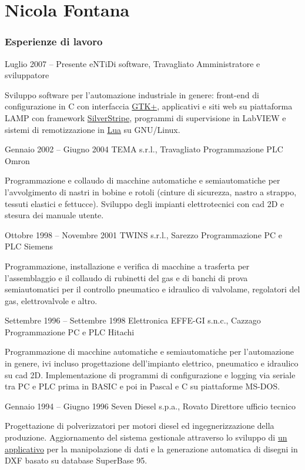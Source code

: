 \documentclass[10pt]{tccv}
\begin{document}
\part{Nicola Fontana}

\section{Esperienze di lavoro}

\begin{eventlist}

\item{Luglio 2007 -- Presente}
     {eNTiDi software, Travagliato}
     {Amministratore e sviluppatore}

Sviluppo software per l'automazione industriale in genere:
front-end di configurazione in C con interfaccia
\href{http://www.gtk.org/}{GTK+}, applicativi e siti web su piattaforma
LAMP con framework \href{http://www.silverstripe.org/}{SilverStripe},
programmi di supervisione in LabVIEW e sistemi di remotizzazione in
\href{http://www.lua.org/}{Lua} su GNU/Linux.

\item{Gennaio 2002 -- Giugno 2004}
     {TEMA s.r.l., Travagliato}
     {Programmazione PLC Omron}

Programmazione e collaudo di macchine automatiche e
semiautomatiche per l'avvolgimento di nastri in bobine e rotoli (cinture
di sicurezza, nastro a strappo, tessuti elastici e fettucce). Sviluppo
degli impianti elettrotecnici con cad 2D e stesura dei manuale
utente.

\item{Ottobre 1998 -- Novembre 2001}
     {TWINS s.r.l., Sarezzo}
     {Programmazione PC e PLC Siemens}

Programmazione, installazione e verifica di macchine a
trasferta per l'assemblaggio e il collaudo di rubinetti del gas e di
banchi di prova semiautomatici per il controllo pneumatico e idraulico
di valvolame, regolatori del gas, elettrovalvole e altro.

\item{Settembre 1996 -- Settembre 1998}
     {Elettronica EFFE-GI s.n.c., Cazzago}
     {Programmazione PC e PLC Hitachi}

Programmazione di macchine automatiche e semiautomatiche per
l'automazione in genere, ivi incluso progettazione dell'impianto
elettrico, pneumatico e idraulico su cad 2D. Implementazione di
programmi di configurazione e logging via seriale tra PC e PLC prima in
BASIC e poi in Pascal e C su piattaforme MS-DOS.

\item{Gennaio 1994 -- Giugno 1996}
     {Seven Diesel s.p.a., Rovato}
     {Direttore ufficio tecnico}

Progettazione di polverizzatori per motori diesel ed ingegnerizzazione
della produzione. Aggiornamento del sistema gestionale attraverso lo
sviluppo di \href{http://adg.entidi.com/home/history/}{un applicativo}
per la manipolazione di dati e la generazione automatica di disegni in
DXF basato su database SuperBase 95.

\end{eventlist}
\end{document}
